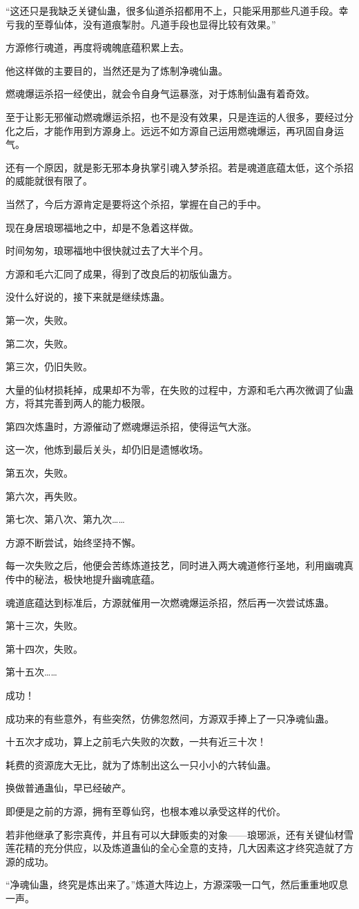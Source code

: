 \begin{this_body}
“这还只是我缺乏关键仙蛊，很多仙道杀招都用不上，只能采用那些凡道手段。幸亏我的至尊仙体，没有道痕掣肘。凡道手段也显得比较有效果。”

方源修行魂道，再度将魂魄底蕴积累上去。

他这样做的主要目的，当然还是为了炼制净魂仙蛊。

燃魂爆运杀招一经使出，就会令自身气运暴涨，对于炼制仙蛊有着奇效。

至于让影无邪催动燃魂爆运杀招，也不是没有效果，只是连运的人很多，要经过分化之后，才能作用到方源身上。远远不如方源自己运用燃魂爆运，再巩固自身运气。

还有一个原因，就是影无邪本身执掌引魂入梦杀招。若是魂道底蕴太低，这个杀招的威能就很有限了。

当然了，今后方源肯定是要将这个杀招，掌握在自己的手中。

现在身居琅琊福地之中，却是不急着这样做。

时间匆匆，琅琊福地中很快就过去了大半个月。

方源和毛六汇同了成果，得到了改良后的初版仙蛊方。

没什么好说的，接下来就是继续炼蛊。

第一次，失败。

第二次，失败。

第三次，仍旧失败。

大量的仙材损耗掉，成果却不为零，在失败的过程中，方源和毛六再次微调了仙蛊方，将其完善到两人的能力极限。

第四次炼蛊时，方源催动了燃魂爆运杀招，使得运气大涨。

这一次，他炼到最后关头，却仍旧是遗憾收场。

第五次，失败。

第六次，再失败。

第七次、第八次、第九次……

方源不断尝试，始终坚持不懈。

每一次失败之后，他便会苦练炼道技艺，同时进入两大魂道修行圣地，利用幽魂真传中的秘法，极快地提升幽魂底蕴。

魂道底蕴达到标准后，方源就催用一次燃魂爆运杀招，然后再一次尝试炼蛊。

第十三次，失败。

第十四次，失败。

第十五次……

成功！

成功来的有些意外，有些突然，仿佛忽然间，方源双手捧上了一只净魂仙蛊。

十五次才成功，算上之前毛六失败的次数，一共有近三十次！

耗费的资源庞大无比，就为了炼制出这么一只小小的六转仙蛊。

换做普通蛊仙，早已经破产。

即便是之前的方源，拥有至尊仙窍，也根本难以承受这样的代价。

若非他继承了影宗真传，并且有可以大肆贩卖的对象——琅琊派，还有关键仙材雪莲花精的充分供应，以及炼道蛊仙的全心全意的支持，几大因素这才终究造就了方源的成功。

“净魂仙蛊，终究是炼出来了。”炼道大阵边上，方源深吸一口气，然后重重地叹息一声。

\end{this_body}

